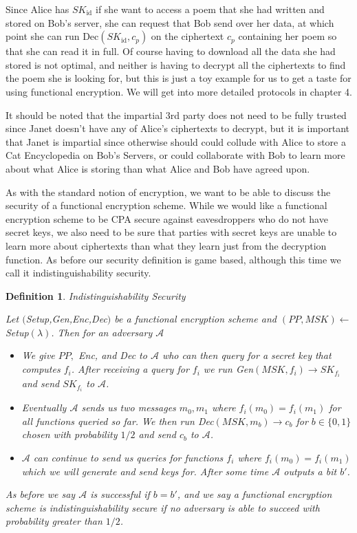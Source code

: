 \documentclass[12pt,twoside]{reedthesis}
\newtheorem{definition}{Definition}
\begin{document}
\par Since Alice has $SK_\text{id}$ if she want to access a poem that she had written and stored on Bob's server, she can request that Bob send over her data, at which point she can run Dec$(SK_\text{id}, c_p)$ on the ciphertext $c_p$ containing her poem so that she can read it in full.  Of course having to download all the data she had stored is not optimal, and neither is having to decrypt all the ciphertexts to find the poem she is looking for, but this is just a toy example for us to get a taste for using functional encryption. We will get into more detailed protocols in chapter 4.


\par It should be noted that the impartial 3rd party does not need to be fully trusted since Janet doesn't have any of Alice's ciphertexts to decrypt, but it is important that Janet is impartial since otherwise should could collude with Alice to store a Cat Encyclopedia on Bob's Servers, or could collaborate with Bob to learn more about what Alice is storing than what Alice and Bob have agreed upon. 


\par As with the standard notion of encryption, we want to be able to discuss the security of a functional encryption scheme. While we would like a functional encryption scheme to be CPA secure against eavesdroppers who do not have secret keys, we also need to be sure that parties with secret keys are unable to learn more about ciphertexts than what they learn just from  the decryption function. As before our security definition is game based, although this time we call it indistinguishability security.\\

\begin{definition}{Indistinguishability Security}
\par Let $($Setup,Gen,Enc,Dec$)$ be a functional encryption scheme and $(PP,MSK)\leftarrow$Setup$(\lambda)$. Then for an adversary $\mathcal{A}$ 
\begin{itemize}
\item We give $PP,$ Enc, and Dec to $\mathcal{A}$ who can then query for a secret key that computes $f_i$. After receiving a query for $f_i$ we run Gen$(MSK,f_i) \to SK_{f_i}$ and send $SK_{f_i}$ to $\mathcal{A}$.
\item Eventually $\mathcal{A}$ sends us two messages $m_0,m_1$ where $f_i(m_0)=f_i(m_1)$ for all functions queried so far. We then run Dec$(MSK,m_b)\to c_b$ for $b\in \{ 0,1 \}$ chosen with probability $1/2$ and send $c_b$ to $\mathcal{A}$.
\item $\mathcal{A}$ can continue to send us queries for functions $f_i$ where $f_i(m_0) = f_i(m_1)$ which we will generate and send keys for. After some time $\mathcal{A}$ outputs a bit $b'$.
\end{itemize}
\par As before we say $\mathcal{A}$ is successful if $b = b'$, and we say a functional encryption scheme is indistinguishability secure if no adversary is able to succeed with probability greater than $1/2$.
\end{definition}
\end{document}
